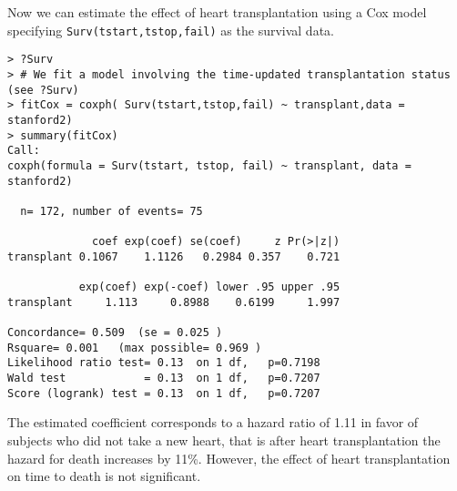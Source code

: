\begin{enumerate}[(a)]
\begin{enumerate}[(i)]
Now we can estimate the effect of heart transplantation using a Cox model specifying 
\verb|Surv(tstart,tstop,fail)| as the survival data.
\begin{spacing}{1.2}
\begin{footnotesize}
\begin{verbatim}
> ?Surv
> # We fit a model involving the time-updated transplantation status (see ?Surv)
> fitCox = coxph( Surv(tstart,tstop,fail) ~ transplant,data = stanford2)
> summary(fitCox)
Call:
coxph(formula = Surv(tstart, tstop, fail) ~ transplant, data = stanford2)

  n= 172, number of events= 75 

             coef exp(coef) se(coef)     z Pr(>|z|)
transplant 0.1067    1.1126   0.2984 0.357    0.721

           exp(coef) exp(-coef) lower .95 upper .95
transplant     1.113     0.8988    0.6199     1.997

Concordance= 0.509  (se = 0.025 )
Rsquare= 0.001   (max possible= 0.969 )
Likelihood ratio test= 0.13  on 1 df,   p=0.7198
Wald test            = 0.13  on 1 df,   p=0.7207
Score (logrank) test = 0.13  on 1 df,   p=0.7207
\end{verbatim}
\end{footnotesize}
\end{spacing} 
The estimated coefficient corresponds to a hazard ratio of 1.11 in favor of subjects
who did not take a new heart, that is after heart transplantation the hazard for death
increases by 11\%. However, the effect of heart transplantation on time to death is not significant.  


\end{enumerate}
\end{enumerate}
